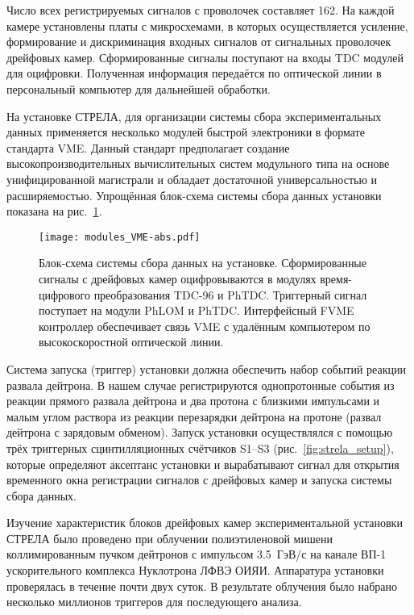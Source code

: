 Число всех регистрируемых сигналов с проволочек составляет 162. На каждой камере
установлены платы с микросхемами, в которых осуществляется усиление,
формирование и дискриминация входных сигналов от сигнальных проволочек дрейфовых
камер. Сформированные сигналы поступают на входы TDC модулей для оцифровки.
Полученная информация передаётся по оптической линии в персональный компьютер
для дальнейшей обработки.

На установке СТРЕЛА, для организации системы сбора экспериментальных данных
применяется несколько модулей быстрой электроники в формате стандарта VME.
Данный стандарт предполагает создание высокопроизводительных вычислительных
систем модульного типа на основе унифицированной магистрали и обладает
достаточной универсальностью и расширяемостью. Упрощённая блок-схема системы
сбора данных установки показана на рис.~\ref{fig:modules_VME.pdf}.

\begin{figure}[h]
  \centering
  \texttt{[image: modules\_VME-abs.pdf]}
  \caption{Блок-схема системы сбора данных на установке. Сформированные сигналы
    с дрейфовых камер оцифровываются в модулях время-цифрового преобразования
    TDC-96 и PhTDC. Триггерный сигнал поступает на модули PhLOM и PhTDC.
    Интерфейсный FVME контроллер обеспечивает связь VME с удалённым компьютером
    по высокоскоростной оптической линии.}
  \label{fig:modules_VME.pdf}
\end{figure}

Система запуска (триггер) установки должна обеспечить набор событий реакции
развала дейтрона. В нашем случае регистрируются однопротонные события из
реакции прямого развала дейтрона \dpret и два протона с близкими импульсами и
малым углом раствора из реакции перезарядки дейтрона на протоне \dpchex (развал
дейтрона с зарядовым обменом). Запуск установки осуществлялся с помощью трёх
триггерных сцинтилляционных счётчиков S1--S3 (рис.~\ref{fig:strela_setup}),
которые определяют аксептанс установки и вырабатывают сигнал для открытия
временного окна регистрации сигналов с дрейфовых камер и запуска системы сбора
данных.

Изучение характеристик блоков дрейфовых камер экспериментальной установки СТРЕЛА
было проведено при облучении полиэтиленовой мишени коллимированным пучком
дейтронов с импульсом 3.5~ГэВ/с на канале ВП-1 ускорительного комплекса
Нуклотрона ЛФВЭ ОИЯИ. Аппаратура установки проверялась в течение почти двух
суток. В результате облучения было набрано несколько миллионов триггеров для
последующего анализа.

